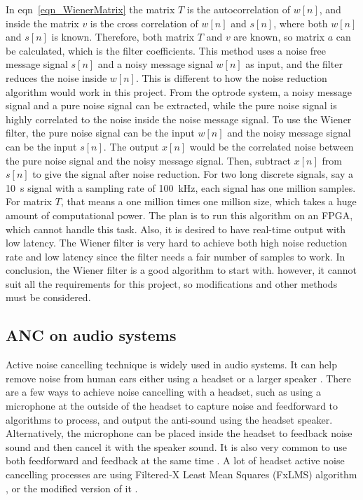 In eqn~\ref{eqn_WienerMatrix} the matrix $T$ is the autocorrelation of $w[n]$, and inside the matrix $v$ is the cross correlation of $w[n]$ and $s[n]$, where both $w[n]$ and $s[n]$ is known.  Therefore, both matrix $T$ and $v$ are known, so matrix $a$ can be calculated, which is the filter coefficients.
This method uses a noise free message signal $s[n]$ and a noisy message signal $w[n]$ as input, and the filter reduces the noise inside $w[n]$.  This is different to how the noise reduction algorithm would work in this project.  From the optrode system, a noisy message signal and a pure noise signal can be extracted, while the pure noise signal is highly correlated to the noise inside the noise message signal.  To use the Wiener filter, the pure noise signal can be the input $w[n]$ and the noisy message signal can be the input $s[n]$.  The output $x[n]$ would be the correlated noise between the pure noise signal and the noisy message signal.  Then, subtract $x[n]$ from $s[n]$ to give the signal after noise reduction.
For two long discrete signals, say a \qty{10}{s} signal with a sampling rate of \qty{100}{kHz}, each signal has one million samples.  For matrix $T$, that means a one million times one million size, which takes a huge amount of computational power.  The plan is to run this algorithm on an FPGA, which cannot handle this task.  Also, it is desired to have real-time output with low latency.  The Wiener filter is very hard to achieve both high noise reduction rate and low latency since the filter needs a fair number of samples to work.
In conclusion, the Wiener filter is a good algorithm to start with.  however, it cannot suit all the requirements for this project, so modifications and other methods must be considered.



\subsection{ANC on audio systems}

Active noise cancelling technique is widely used in audio systems.  It can help remove noise from human ears either using a headset \cite{ANC_Headphone_10} or a larger speaker \cite{ANC_Car}.  There are a few ways to achieve noise cancelling with a headset, such as using a microphone at the outside of the headset to capture noise and feedforward \cite{ANC_Headphone_8} to algorithms to process, and output the anti-sound using the headset speaker.  Alternatively, the microphone can be placed inside the headset to feedback \cite{ANC_Headphone_5} noise sound and then cancel it with the speaker sound.  It is also very common to use both feedforward and feedback at the same time \cite{ANC_Headphone_4}.  
A lot of headset active noise cancelling processes \cite{ANC_Headphone_1}\cite{ANC_Headphone_2} are using Filtered-X Least Mean Squares (FxLMS) algorithm \cite{ANC_Headphone_7}, or the modified version of it \cite{ANC_Headphone_9}\cite{ANC_Headphone_6}.

